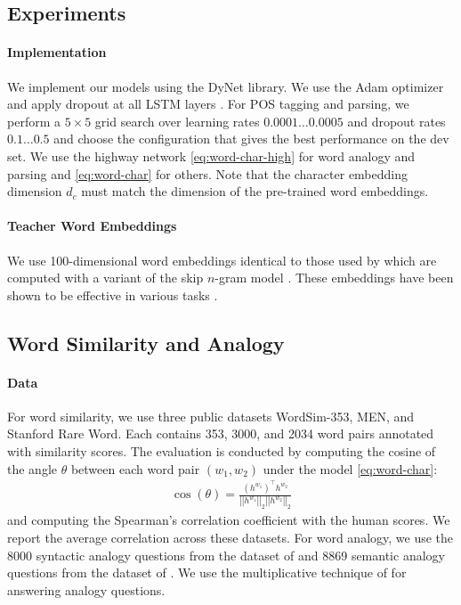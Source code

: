 \documentclass[11pt,letterpaper,UTF8]{article}
\newcommand{\paren}[1]{\left(#1\right)}
\newcommand{\by}{\ensuremath{\times}}
\newcommand{\norm}[1]{\left|\left|#1\right|\right|}
\begin{document}
\begin{CJK}{UTF8}{gbsn}
\section{Experiments}
\label{sec:experiments}

\paragraph{Implementation} We implement our models using the DyNet library.
We use the Adam optimizer \cite{kingma2014adam} and apply dropout at all LSTM layers \cite{hinton2012improving}.
For POS tagging and parsing, we perform a $5 \by 5$ grid search over learning rates $0.0001 \ldots 0.0005$
and dropout rates $0.1 \ldots 0.5$ and choose the configuration that gives the best performance on the dev set.
We use the highway network \eqref{eq:word-char-high} for word analogy and parsing and \eqref{eq:word-char} for others.
Note that the character embedding dimension $d_c$ must match the dimension of the pre-trained word embeddings.

\paragraph{Teacher Word Embeddings}
We use 100-dimensional word embeddings identical to those used by 
which are computed with a variant of the skip $n$-gram model \cite{ling2015not}.
These embeddings have been shown to be effective in various tasks \cite{dyer2015transition,lample2016neural}.

\subsection{Word Similarity and Analogy}

\paragraph{Data}
For word similarity, we use three public datasets WordSim-353, MEN, and Stanford Rare Word.
Each contains 353, 3000, and 2034 word pairs annotated with similarity scores.
The evaluation is conducted by computing the cosine of the angle $\theta$ between each word pair $(w_1, w_2)$ under the model \eqref{eq:word-char}:
\begin{align}
\cos(\theta) = \frac{\paren{h^{w_1}}^\top h^{w_2}}{\norm{h^{w_1}}_2 \norm{h^{w_2}}_2} \label{eq:sim-cos}
\end{align}
and computing the Spearman's correlation coefficient with the human scores.
We report the average correlation across these datasets.
For word analogy, we use the 8000 syntactic analogy questions from the dataset of 
and 8869 semantic analogy questions from the dataset of .
We use the multiplicative technique of  for answering analogy questions.



\end{CJK}
\end{document}
